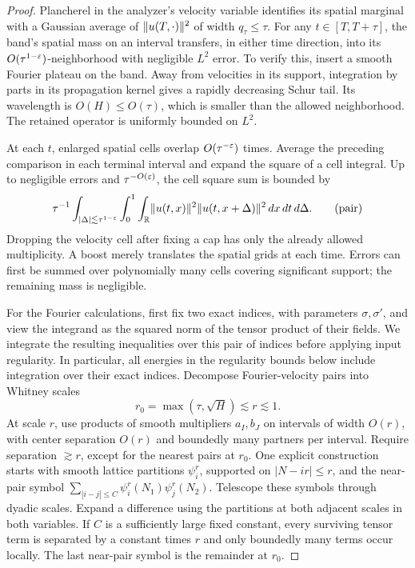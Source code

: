 \begin{proof}
Plancherel in the analyzer's velocity variable identifies its spatial
marginal with a Gaussian average of $\lVert u(T,\cdot)\rVert^2$ of width
$q_\tau\leq\tau$. For any $t\in[T,T+\tau]$, the band's spatial mass
on an interval transfers, in either time direction, into its
$O(\tau^{1-\varepsilon})$-neighborhood with negligible $L^2$ error. To verify
this, insert a smooth Fourier plateau on the band. Away from velocities
in its support, integration by parts in its propagation kernel gives a
rapidly decreasing Schur tail. Its wavelength is $O(H)\leq O(\tau)$,
which is smaller than the allowed neighborhood. The retained operator is
uniformly bounded on $L^2$.

At each $t$, enlarged spatial cells overlap $O(\tau^{-\varepsilon})$ times.
Average the preceding comparison in each terminal interval and expand
the square of a cell integral. Up to negligible errors and
$\tau^{-O(\varepsilon)}$, the cell square sum is bounded by
\begin{equation}
 \tau^{-1}\int_{|\Delta|\lesssim\tau^{1-\varepsilon}}
 \int_0^1\int_\mathbb R
       \lVert u(t,x)\rVert^2\lVert u(t,x+\Delta)\rVert^2\,dx\,dt\,d\Delta.
 \tag{pair}\label{eq:pair}
\end{equation}
Dropping the velocity cell after fixing a cap has only the already
allowed multiplicity. A boost merely translates the spatial grids at
each time. Errors can first be summed over polynomially many cells
covering significant support; the remaining mass is negligible.

For the Fourier calculations, first fix two exact indices, with parameters
$\sigma,\sigma'$, and view the integrand as the squared norm of the
tensor product of their fields. We integrate the resulting inequalities
over this pair of indices before applying input regularity. In particular,
all energies in the regularity bounds below include integration over their
exact indices. Decompose
Fourier-velocity pairs into Whitney scales
\[
 r_0=\max(\tau,\sqrt H)\lesssim r\lesssim1.
\]
At scale $r$, use products of smooth multipliers $a_I,b_J$ on intervals
of width $O(r)$, with center separation $O(r)$ and boundedly many
partners per interval. Require separation $\gtrsim r$, except for the
nearest pairs at $r_0$. One explicit construction starts with smooth
lattice partitions $\psi_i^r$, supported on $|N-ir|\leq r$, and the
near-pair symbol $\sum_{|i-j|\leq C}\psi_i^r(N_1)\psi_j^r(N_2)$.
Telescope these symbols through dyadic scales. Expand a difference using
the partitions at both adjacent scales in both variables. If $C$ is a
sufficiently large fixed constant, every surviving tensor term is
separated by a constant times $r$ and only boundedly many terms occur
locally. The last near-pair symbol is the remainder at $r_0$.


\end{proof}
